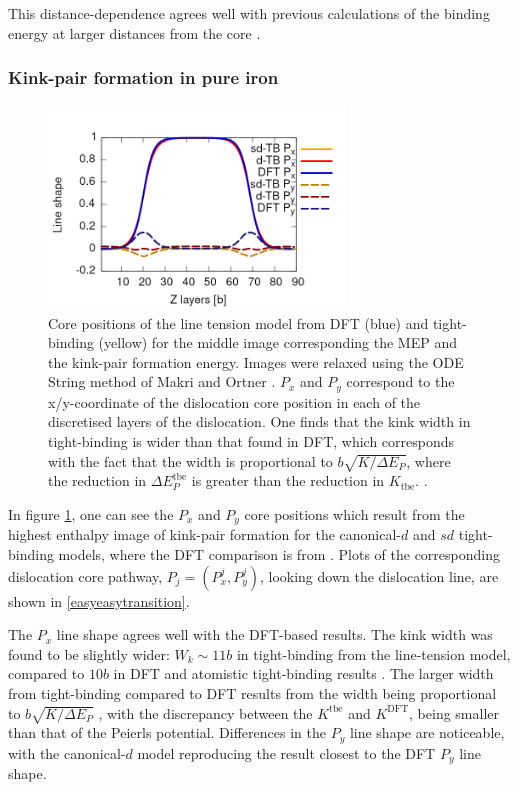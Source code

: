 \documentclass[a4paper,11pt]{article}
\begin{document}
This distance-dependence agrees well with previous calculations of the binding energy
at larger distances from the core \cite{Hanlumyuang2010}.

\subsubsection{Kink-pair formation in pure iron}
\label{sec:org5930ce6}

\begin{figure}[htbp]
\centering
\includegraphics[width=0.7\textwidth]{Images/lineshape-all_correct_gradient.png}
\caption{Core positions of the line tension model from DFT (blue) and tight-binding (yellow) for the middle image corresponding the MEP and the kink-pair formation energy. Images were relaxed using the ODE String method of Makri and Ortner \cite{Makri2019}. \(P_x\) and \(P_y\) correspond to the x/y-coordinate of the dislocation core position in each of the discretised layers of the dislocation. One finds that the kink width in tight-binding is wider than that found in DFT, which corresponds with the fact that the width is proportional to \(b\sqrt{K/\Delta E_P}\), where the reduction in \(\Delta E_P^{\text{tbe}}\) is greater than the reduction in \(K_{\text{tbe}}\).   \label{lineshape}.}
\end{figure}



In figure \ref{lineshape}, one can see the \(P_x\) and \(P_y\) core positions which
result from the highest enthalpy image of kink-pair formation for the
canonical-\(d\) and \(sd\) tight-binding models, where the DFT comparison is from
\cite{Itakura2012}. Plots of the corresponding dislocation core pathway, \(P_j =
    (P^j_x, P^j_y)\), looking down the dislocation line, are shown in
\ref{easyeasytransition}.

The \(P_x\) line shape agrees well with the DFT-based results. The kink width
was found to be slightly wider: \(W_k \sim 11b\) in tight-binding from the
line-tension model, compared to \(10b\) in DFT and atomistic tight-binding
results \cite{Simpson2019}. The larger width from tight-binding compared to
DFT results from the width being proportional to \(b\sqrt{K/\Delta E_P}\)
\cite{Itakura2012}, with the discrepancy between the \(K^{\text{tbe} }\) and
\(K^{\text{DFT} }\), being smaller than that of the Peierls
potential. Differences in the \(P_y\) line shape are noticeable, with the
canonical-\(d\) model reproducing the result closest to the DFT \(P_y\) line
shape.
\end{document}
